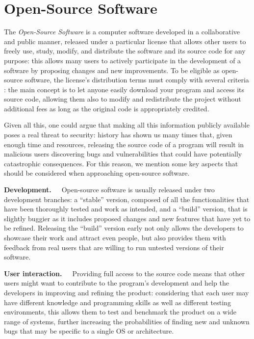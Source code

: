 \section{Open-Source Software} \label{opensource}
The \textit{Open-Source Software} is a computer software developed in a collaborative and public manner, released under a particular license that allows other users to freely use, study, modify, and distribute the software and its source code for any purpose: this allows many users to actively participate in the development of a software by proposing changes and new improvements.
To be eligible as open-source software, the license's distribution terms must comply with several criteria \cite{osd}: the main concept is to let anyone easily download your program and access its source code, allowing them also to modify and redistribute the project without additional fees as long as the original code is appropriately credited. 

Given all this, one could argue that making all this information publicly available poses a real threat to security: history has shown us many times that, given enough time and resources, releasing the source code of a program will result in malicious users discovering bugs and vulnerabilities that could have potentially catastrophic consequences. For this reason, we mention some key aspects that should be considered when approaching open-source software.

\textbf{Development.}\ \ \ Open-source software is usually released under two development branches: a ``stable'' version, composed of all the functionalities that have been thoroughly tested and work as intended, and a ``build'' version, that is slightly buggier as it includes proposed changes and new features that have yet to be refined. Releasing the ``build'' version early not only allows the developers to showcase their work and attract even people, but also provides them with feedback from real users that are willing to run untested versions of their software.

\textbf{User interaction.}\ \ \ Providing full access to the source code means that other users might want to contribute to the program's development and help the developers in improving and refining the product: considering that each user may have different knowledge and programming skills as well as different testing environments, this allows them to test and benchmark the product on a wide range of systems, further increasing the probabilities of finding new and unknown bugs that may be specific to a single OS or architecture.

